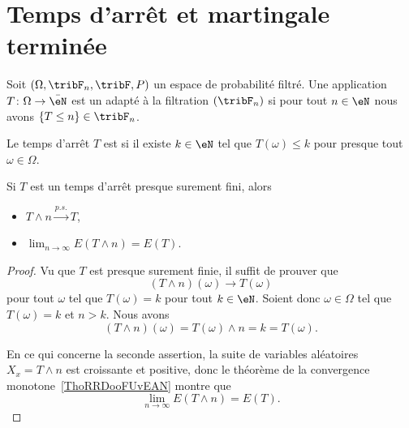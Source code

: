 \section{Temps d'arrêt et martingale terminée}

\begin{definition}
	Soit \( (\Omega,\tribF_n,\tribF,P)\) un espace de probabilité filtré. Une application \( T\colon \Omega\to \bar \eN\) est un  adapté à la filtration \( (\tribF_n)\) si pour tout \( n\in \eN\) nous avons \( \{ T\leq n \}\in\tribF_n\).

	Le temps d'arrêt \( T\) est  si il existe \( k\in \eN\) tel que \( T(\omega)\leq k\) pour presque tout \( \omega\in \Omega\).
\end{definition}

\begin{lemma} \label{LemXYeCLXW}
	Si \( T\) est un temps d'arrêt presque surement fini, alors
	\begin{itemize}
		\item \( T\wedge n\stackrel{p.s.}{\longrightarrow}T\),
		\item   \label{ItemIPPkxmAii}
		      \( \lim_{n\to \infty}  E(T\wedge n)=E(T)\).
	\end{itemize}
\end{lemma}

\begin{proof}
	Vu que \( T \) est presque surement finie, il suffit de prouver que
	\begin{equation}    \label{EqRVoKxsN}
		(T\wedge n)(\omega)\to T(\omega)
	\end{equation}
	pour tout \( \omega\) tel que \( T(\omega)=k\) pour tout \( k\in \eN\). Soient donc \( \omega\in \Omega\) tel que \( T(\omega)=k\) et \( n>k\). Nous avons
	\begin{equation}
		(T\wedge n)(\omega)=T(\omega)\wedge n=k=T(\omega).
	\end{equation}

	En ce qui concerne la seconde assertion, la suite de variables aléatoires \( X_x=T\wedge n\) est croissante et positive, donc le théorème de la convergence monotone~\ref{ThoRRDooFUvEAN} montre que
	\begin{equation}
		\lim_{n\to \infty}E(T\wedge n)=E(T).
	\end{equation}
\end{proof}


